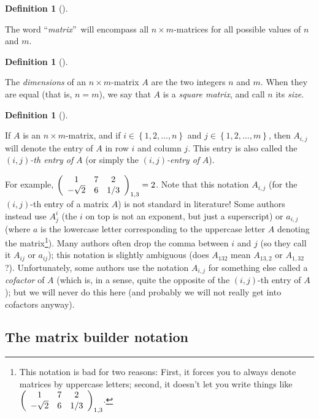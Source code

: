 \documentclass[numbers=enddot,12pt,final,onecolumn,notitlepage]{scrartcl}%
\theoremstyle{definition}
\newtheorem{defi}[theo]{Definition}
\newenvironment{definition}[1][]
{\begin{defi}[#1]\begin{leftbar}}
{\end{leftbar}\end{defi}}
\begin{document}
\begin{definition}
The word \textquotedblleft\textit{matrix}\textquotedblright\ will encompass
all $n\times m$-matrices for all possible values of $n$ and $m$.
\end{definition}

\begin{definition}
The \textit{dimensions} of an $n\times m$-matrix $A$ are the two integers $n$
and $m$. When they are equal (that is, $n=m$), we say that $A$ is a
\textit{square matrix}, and call $n$ its \textit{size}.
\end{definition}

\begin{definition}
If $A$ is an $n\times m$-matrix, and if $i\in\left\{  1,2,\ldots,n\right\}  $
and $j\in\left\{  1,2,\ldots,m\right\}  $, then $A_{i,j}$ will denote the
entry of $A$ in row $i$ and column $j$. This entry is also called the $\left(
i,j\right)  $\textit{-th entry of }$A$ (or simply the $\left(  i,j\right)
$\textit{-entry of }$A$).
\end{definition}

For example, $\left(
\begin{array}
[c]{ccc}%
1 & 7 & 2\\
-\sqrt{2} & 6 & 1/3
\end{array}
\right)  _{1,3}=2$. Note that this notation $A_{i,j}$ (for the $\left(
i,j\right)  $-th entry of a matrix $A$) is not standard in literature! Some
authors instead use $A_{j}^{i}$ (the $i$ on top is not an exponent, but just a
superscript) or $a_{i,j}$ (where $a$ is the lowercase letter corresponding to
the uppercase letter $A$ denoting the matrix\footnote{This notation is bad for
two reasons: First, it forces you to always denote matrices by uppercase
letters; second, it doesn't let you write things like $\left(
\begin{array}
[c]{ccc}%
1 & 7 & 2\\
-\sqrt{2} & 6 & 1/3
\end{array}
\right)  _{1,3}$.}). Many authors often drop the comma between $i$ and $j$ (so
they call it $A_{ij}$ or $a_{ij}$); this notation is slightly ambiguous (does
$A_{132}$ mean $A_{13,2}$ or $A_{1,32}$ ?). Unfortunately, some authors use
the notation $A_{i,j}$ for something else called a \textit{cofactor} of $A$
(which is, in a sense, quite the opposite of the $\left(  i,j\right)  $-th
entry of $A$); but we will never do this here (and probably we will not really
get into cofactors anyway).

\subsection{The matrix builder notation}
\end{document}
